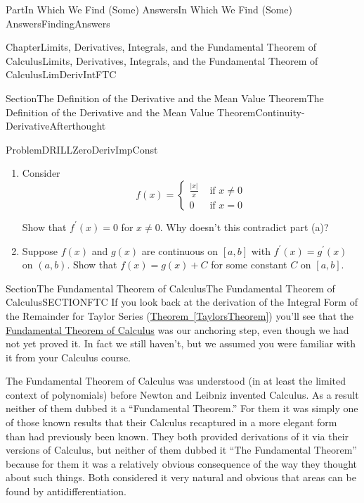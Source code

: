 \documentclass[oneside,10pt,]{book}
\newcommand{\blocktitlefont}{\relax}
\newcommand{\xreffont}{\relax}
\numberwithin{equation}{part}
\newcommand{\abs}[1]{\left|#1\right|}
\newcommand{\amp}{&}
\begin{document}
\begin{partptx}{Part}{In Which We Find (Some) Answers}{}{In Which We Find (Some) Answers}{}{}{FindingAnswers}
\begin{chapterptx}{Chapter}{Limits, Derivatives, Integrals, and the Fundamental Theorem of Calculus}{}{Limits, Derivatives, Integrals, and the Fundamental Theorem of Calculus}{}{}{LimDerivIntFTC}
\begin{sectionptx}{Section}{The Definition of  the Derivative and the Mean Value Theorem}{}{The Definition of  the Derivative and the Mean Value Theorem}{}{}{Continuity-DerivativeAfterthought}
\begin{problem}{Problem}{}{DRILLZeroDerivImpConst}
\begin{enumerate}[font=\bfseries,label=(\alph*),ref=\alph*]
\par\smallskip%
\noindent\textbf{\blocktitlefont Hint}.\hypertarget{DRILLZeroDerivImpConst-1-2}{}\quad{}Show that for any \(x, y\in [a,b]\), \(x\neq y\), \(f(x)=f(y)\).%
\item{}Consider%
\begin{equation*}
f(x)=
\begin{cases}
\frac{\abs{x} }{x}\amp \text{ if } x\neq 0\\
0\amp \text{ if } x=0
\end{cases}
\end{equation*}
\par
Show that \(f^\prime(x)=0\) for \(x\neq 0\).  Why doesn't this contradict part (a)?%
\item{}Suppose \(f(x)\) and \(g(x)\) are continuous on \([a,b]\) with \(f^\prime(x)=g^\prime(x)\) on \((a,b)\).  Show that \(f(x)=g(x)+C\) for some constant \(C\) on \([a,b]\).%
\end{enumerate}%
\end{problem}
\end{sectionptx}
%
%
\typeout{************************************************}
\typeout{************************************************}
%
\begin{sectionptx}{Section}{The Fundamental Theorem of Calculus}{}{The Fundamental Theorem of Calculus}{}{}{SECTIONFTC}
If you look back at the derivation of the Integral Form of the Remainder for Taylor Series (\hyperref[TaylorsTheorem]{Theorem~{\xreffont\ref{TaylorsTheorem}}}) you'll see that the \hyperref[THEOREMFTCCauchy]{Fundamental Theorem of Calculus} was our anchoring step, even though we had not yet proved it. In fact we still haven't, but we assumed you were familiar with it from your Calculus course.%
\par
The Fundamental Theorem of Calculus was understood (in at least the limited context of polynomials) before Newton and Leibniz invented Calculus. As a result neither of them dubbed it a ``Fundamental Theorem.'' For them it was simply one of those known results that their Calculus re\textendash{}captured in a more elegant form than had previously been known. They both provided derivations of it via their versions of Calculus, but neither of them dubbed it ``The Fundamental Theorem'' because for them it was a relatively obvious consequence of the way they thought about such things. Both considered it very natural and obvious that areas can be found by antidifferentiation.%
\par

\end{sectionptx}
\end{chapterptx}
\end{partptx}
\end{document}
